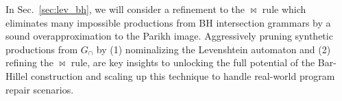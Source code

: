 \documentclass[sigplan,acmsmall,nonacm,screen]{acmart}\settopmatter{printfolios=false,printccs=false,printacmref=false}
\begin{document}
%
%

In Sec.~\ref{sec:lev_bh}, we will consider a refinement to the $\Join$ rule which eliminates many impossible productions from BH intersection grammars by a sound overapproximation to the Parikh image. Aggressively pruning synthetic productions from $G_\cap$ by (1) nominalizing the Levenshtein automaton and (2) refining the $\Join$ rule, are key insights to unlocking the full potential of the Bar-Hillel construction and scaling up this technique to handle real-world program repair scenarios.
\end{document}
